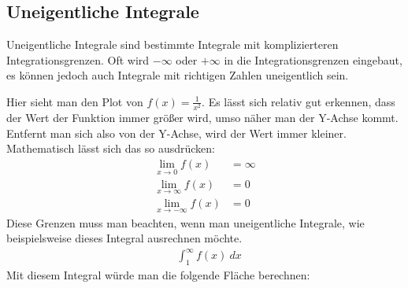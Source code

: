 \subsection{Uneigentliche Integrale}
\begin{flushleft}
    Uneigentliche Integrale sind bestimmte Integrale mit komplizierteren Integrationsgrenzen.
    Oft wird $-\infty$ oder $+\infty$ in die Integrationsgrenzen eingebaut, es können jedoch auch Integrale mit richtigen Zahlen uneigentlich sein.
\end{flushleft}

\begin{center}
\end{center}

\begin{flushleft}
    Hier sieht man den Plot von $f(x)=\frac{1}{x^2}$.
    Es lässt sich relativ gut erkennen, dass der Wert der Funktion immer größer wird, umso näher man der Y-Achse kommt.
    Entfernt man sich also von der Y-Achse, wird der Wert immer kleiner.
    Mathematisch lässt sich das so ausdrücken:
    \begin{align}
        \lim_{x \to 0} f(x) &= \infty \\
        \lim_{x \to \infty} f(x) &= 0 \\
        \lim_{x \to -\infty} f(x) &= 0
    \end{align}
    Diese Grenzen muss man beachten, wenn man uneigentliche Integrale, wie beispielsweise dieses Integral ausrechnen möchte.
    \begin{align}
        &\int_{1}^{\infty} f(x) \ dx
    \end{align}
    Mit diesem Integral würde man die folgende Fläche berechnen:
\end{flushleft}

\begin{center}
\end{center}

